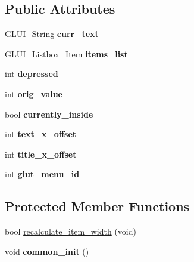 \subsection*{Public Attributes}
\begin{DoxyCompactItemize}
\item 
\hypertarget{class_g_l_u_i___listbox_a914b9f8f231fe92b507ec64fbe209271}{G\+L\+U\+I\+\_\+\+String {\bfseries curr\+\_\+text}}\label{class_g_l_u_i___listbox_a914b9f8f231fe92b507ec64fbe209271}

\item 
\hypertarget{class_g_l_u_i___listbox_a1c6c9d72bdb2c2197ecbe99091534f87}{\hyperlink{class_g_l_u_i___listbox___item}{G\+L\+U\+I\+\_\+\+Listbox\+\_\+\+Item} {\bfseries items\+\_\+list}}\label{class_g_l_u_i___listbox_a1c6c9d72bdb2c2197ecbe99091534f87}

\item 
\hypertarget{class_g_l_u_i___listbox_a1e00ed51f0b6c8d7e82e8974889a40e7}{int {\bfseries depressed}}\label{class_g_l_u_i___listbox_a1e00ed51f0b6c8d7e82e8974889a40e7}

\item 
\hypertarget{class_g_l_u_i___listbox_a5ee58581ac1506984e30868cc8a8c1ec}{int {\bfseries orig\+\_\+value}}\label{class_g_l_u_i___listbox_a5ee58581ac1506984e30868cc8a8c1ec}

\item 
\hypertarget{class_g_l_u_i___listbox_a5710debcc1604913c926f65db2019b56}{bool {\bfseries currently\+\_\+inside}}\label{class_g_l_u_i___listbox_a5710debcc1604913c926f65db2019b56}

\item 
\hypertarget{class_g_l_u_i___listbox_a0f40668bfe80f3fce9c0e027f9e52701}{int {\bfseries text\+\_\+x\+\_\+offset}}\label{class_g_l_u_i___listbox_a0f40668bfe80f3fce9c0e027f9e52701}

\item 
\hypertarget{class_g_l_u_i___listbox_a4bc9d6c3e849e840b0f61eb446ecba95}{int {\bfseries title\+\_\+x\+\_\+offset}}\label{class_g_l_u_i___listbox_a4bc9d6c3e849e840b0f61eb446ecba95}

\item 
\hypertarget{class_g_l_u_i___listbox_a6efefff573e3d8a77454c94b2aec15c7}{int {\bfseries glut\+\_\+menu\+\_\+id}}\label{class_g_l_u_i___listbox_a6efefff573e3d8a77454c94b2aec15c7}

\end{DoxyCompactItemize}
\subsection*{Protected Member Functions}
\begin{DoxyCompactItemize}
\item 
bool \hyperlink{class_g_l_u_i___listbox_a2d7f6743dea0483354ba495eedfd7d5e}{recalculate\+\_\+item\+\_\+width} (void)
\item 
\hypertarget{class_g_l_u_i___listbox_aab5847ab5aa4011667334e9dfb6a5c67}{void {\bfseries common\+\_\+init} ()}\label{class_g_l_u_i___listbox_aab5847ab5aa4011667334e9dfb6a5c67}

\end{DoxyCompactItemize}
